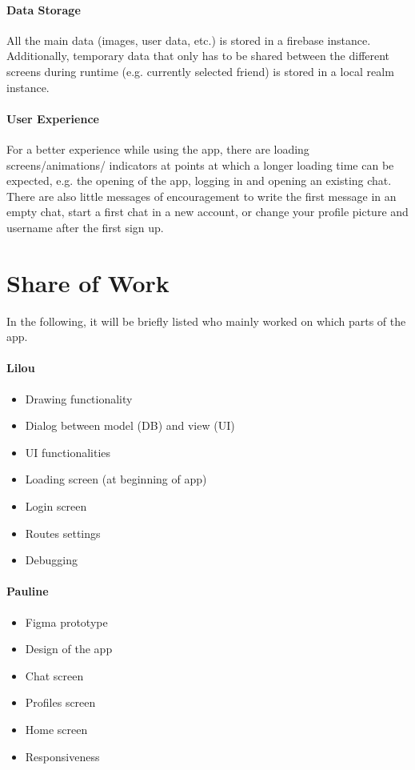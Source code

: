\documentclass{article}
\begin{document}
\paragraph{Data Storage}
All the main data (images, user data, etc.) is stored in a firebase instance. Additionally, temporary data that only has to be shared between the different screens during runtime (e.g. currently selected friend) is stored in a local realm instance. 


\paragraph{User Experience} %
For a better experience while using the app, there are loading screens/animations/ indicators at points at which a longer loading time can be expected, e.g. the opening of the app, logging in and opening an existing chat. 
There are also little messages of encouragement to write the first message in an empty chat, start a first chat in a new account, or change your profile picture and username after the first sign up. 

\section{Share of Work}
In the following, it will be briefly listed who mainly worked on which parts of the app. 

\paragraph{Lilou}
\begin{itemize}
\item Drawing functionality
\item Dialog between model (DB) and view (UI)
\item UI functionalities
\item Loading screen (at beginning of app)
\item Login screen
\item Routes settings
\item Debugging

\end{itemize} 

\paragraph{Pauline}
\begin{itemize}
\item Figma prototype
\item Design of the app 
\item Chat screen 
\item Profiles screen 
\item Home screen 
\item Responsiveness
\end{itemize}
\end{document}
